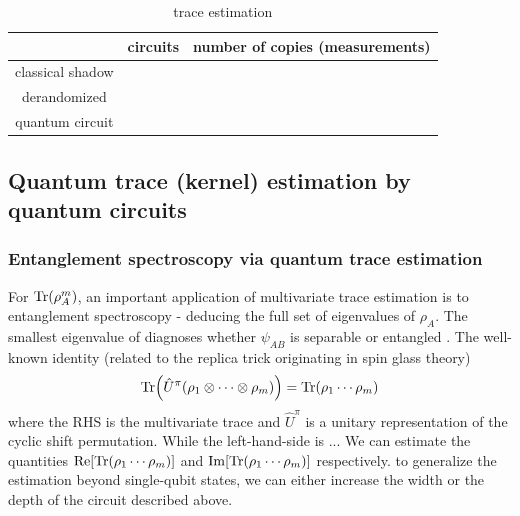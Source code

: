 \documentclass[
10pt,
aps,
pra,
linenumbers,
floatfix,
]{revtex4-2}
\theoremstyle{plain}
\theoremstyle{definition}
\newcommand{\U}{\hat{U}}
\newcommand{\dm}{\rho}
\begin{document}
\begin{table}[!ht]
	\centering
	\begin{tabular}{c|c|c}
		& circuits & number of copies (measurements) \\
		\hline
		classical shadow & & \\  
		derandomized & & \\  
		quantum circuit & & \\  
		\hline
	\end{tabular}
	\caption{trace estimation}
\end{table}

\subsection{Quantum trace (kernel) estimation by quantum circuits}
\subsubsection{Entanglement spectroscopy via quantum trace estimation}
For $\Tr(\dm_A^m)$, an important application of multivariate trace estimation \cite{quekMultivariateTraceEstimation2022} is to entanglement spectroscopy \cite{ekertDirectEstimationsLinear2002} \cite{johriEntanglementSpectroscopyQuantum2017} \cite{elbenMixedstateEntanglementLocal2020} - deducing the full set of eigenvalues of $\dm_A$. The smallest eigenvalue of diagnoses whether $\psi_{AB}$ is separable or entangled \cite{horodeckiDirectDetectionQuantum2002}. 
The well-known identity (related to the replica trick originating in spin glass theory)
\begin{equation}
	\Tr(\U^{\pi} (\dm_1 \otimes \cdots \otimes \dm_m) ) = 
	\Tr(\dm_1\cdots \dm_m)
\end{equation}
where the RHS is the multivariate trace and $\U^{\pi}$ is a unitary representation of the cyclic shift permutation.
While the left-hand-side is ...
We can estimate the quantities $\Re [\Tr(\dm_1\cdots \dm_m)]$ and $\Im [\Tr(\dm_1\cdots \dm_m)]$ respectively.
to generalize the estimation beyond single-qubit states, we can either increase the width or the depth of the circuit described above.
\end{document}
